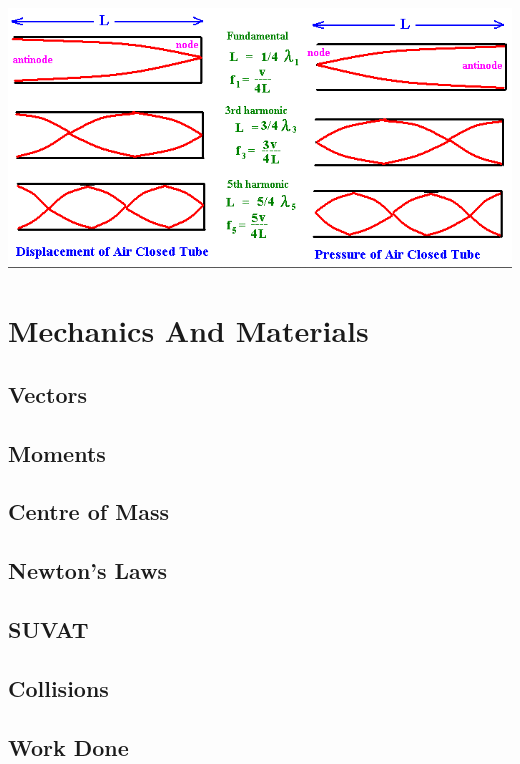 \documentclass[a4paper, 12pt]{article}
\begin{document}
\begin{center}
\includegraphics[width=\textwidth]{images/harmonicInTube.png}
\end{center}

\newpage
\section{Mechanics And Materials}

\subsection{Vectors}

\subsection{Moments}

\subsection{Centre of Mass}

\subsection{Newton's Laws}

\subsection{SUVAT}

\subsection{Collisions}

\subsection{Work Done}
\end{document}
